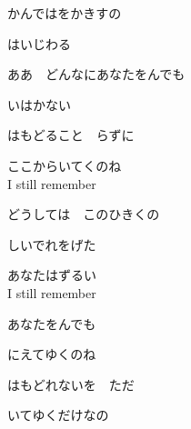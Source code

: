 {かんではをかきすの

はいじわる

ああ　どんなにあなたをんでも

いはかない

はもどること　らずに

ここからいてくのね
\\

I still remember

どうしては　このひきくの

しいでれをげた

あなたはずるい
\\

I still remember

あなたをんでも

にえてゆくのね

はもどれないを　ただ

いてゆくだけなの

}